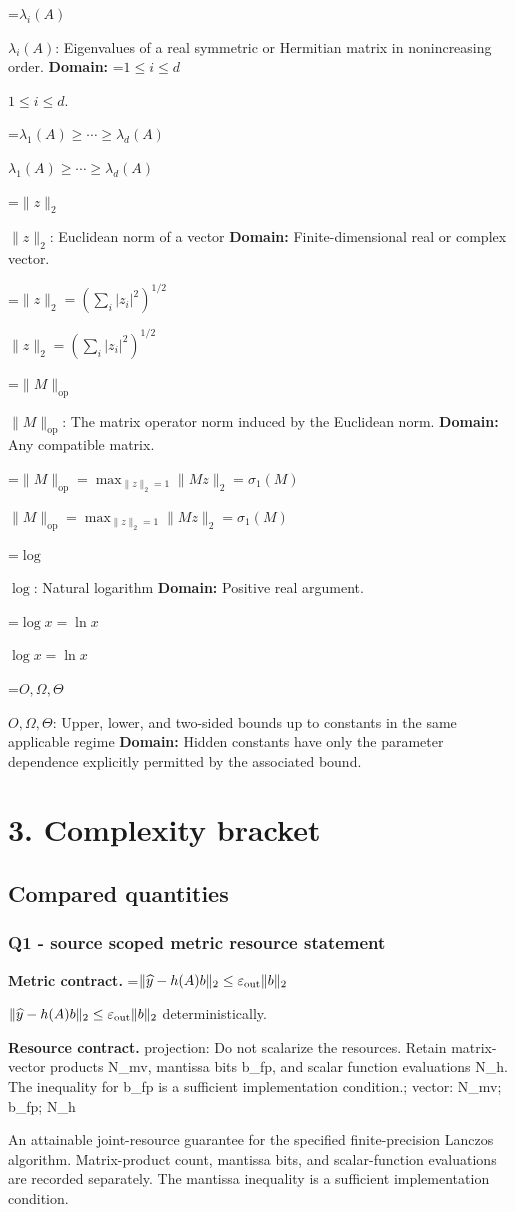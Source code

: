 \documentclass[10pt,a4paper]{article}
\newcommand{\AtlasMath}[1]{\par\begingroup\centering\setbox0=\hbox{$\displaystyle #1$}\ifdim\wd0>1.4\linewidth\typeout{ATLAS WIDE FORMULA: \the\wd0}\fi\ifdim\wd0>\linewidth\resizebox{\linewidth}{!}{\box0}\else\box0\fi\par\endgroup}
\newcommand{\AtlasInlineMath}[1]{\begingroup\setbox0=\hbox{$#1$}\ifdim\wd0>.4\linewidth\endgroup\AtlasMath{#1}\else\endgroup$#1$\fi}
\begin{document}
\AtlasInlineMath{\lambda_i(A)}: Eigenvalues of a real symmetric or Hermitian matrix in nonincreasing order. \textbf{Domain:} \AtlasInlineMath{1\le i\le d}.

\AtlasInlineMath{\lambda_1(A)\ge\cdots\ge\lambda_d(A)}

\AtlasInlineMath{\|z\|_2}: Euclidean norm of a vector \textbf{Domain:} Finite-dimensional real or complex vector.

\AtlasInlineMath{\|z\|_2=(\sum_i|z_i|^2)^{1/2}}

\AtlasInlineMath{\|M\|_{\mathrm{op}}}: The matrix operator norm induced by the Euclidean norm. \textbf{Domain:} Any compatible matrix.

\AtlasInlineMath{\|M\|_{\mathrm{op}}=\max_{\|z\|_2=1}\|Mz\|_2=\sigma_1(M)}

\AtlasInlineMath{\log}: Natural logarithm \textbf{Domain:} Positive real argument.

\AtlasInlineMath{\log x=\ln x}

\AtlasInlineMath{O,\Omega,\Theta}: Upper, lower, and two-sided bounds up to constants in the same applicable regime \textbf{Domain:} Hidden constants have only the parameter dependence explicitly permitted by the associated bound.

\section{3. Complexity bracket}
\subsection{Compared quantities}
\subsubsection{Q1 - source scoped metric resource statement}
\textbf{Metric contract.} \AtlasInlineMath{\|\widehat y-h(A)b\|_2\le\varepsilon_{\rm out}\|b\|_2} deterministically.

\textbf{Resource contract.} projection: Do not scalarize the resources. Retain matrix-vector products N\_\allowbreak{}mv, mantissa bits b\_\allowbreak{}fp, and scalar function evaluations N\_\allowbreak{}h. The inequality for b\_\allowbreak{}fp is a sufficient implementation condition.; vector: N\_\allowbreak{}mv; b\_\allowbreak{}fp; N\_\allowbreak{}h

An attainable joint-resource guarantee for the specified finite-precision Lanczos algorithm. Matrix-product count, mantissa bits, and scalar-function evaluations are recorded separately. The mantissa inequality is a sufficient implementation condition.
\end{document}
